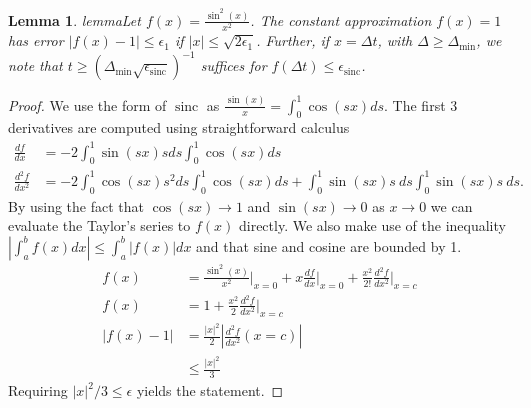 \documentclass{article}
\newtheorem{lemma}[theorem]{Lemma}
\newcommand{\abs}[1]{\left| #1 \right|}
\DeclareMathOperator{\sinc}{sinc}
\begin{document}
\begin{lemma}{lemma}\label{lem:sinc_poly_approx}
    Let $f(x) = \frac{\sin^2(x)}{x^2}$. The constant approximation $f(x) = 1$ has error $|f(x) - 1| \leq \epsilon_{1}$ if $|x| \leq \sqrt{2 \epsilon_{1}}$. Further, if $x = \Delta t$, with $\Delta \geq \Delta_{\min}$, we note that $t \geq (\Delta_{\min} \sqrt{\epsilon_{\sinc} } )^{-1}$ suffices for $f(\Delta t) \leq \epsilon_{\sinc}$.
\end{lemma}
\begin{proof}
    We use the form of $\sinc$ as $\frac{\sin(x)}{x} = \int_0^1 \cos(sx) ds$. The first 3 derivatives are computed using straightforward calculus
    \begin{align}
        \frac{df}{dx} &= -2 \int_0^1 \sin(sx) s ds \int_0^1 \cos(sx) ds \\
        \frac{d^2f}{dx^2} &= -2 \int_0^1 \cos(sx)s^2 ds \int_0^1 \cos(sx) ds + \int_0^1 \sin(sx) s ~ds \int_0^1 \sin(sx) s ~ds.
    \end{align}
    By using the fact that $\cos(sx) \to 1$ and $\sin(sx) \to 0$ as $x \to 0$ we can evaluate the Taylor's series to $f(x)$ directly. We also make use of the inequality $\abs{\int_a^b f(x) dx} \leq \int_a^b \abs{f(x)} dx$ and that sine and cosine are bounded by 1.
    \begin{align}
        f(x) &= \frac{\sin^2(x)}{x^2} \bigg|_{x = 0} + x \frac{df}{dx}\bigg|_{x = 0} + \frac{x^2}{2!} \frac{d^2f}{dx^2}\bigg|_{x=c} \\
        f(x) &= 1 + \frac{x^2}{2} \frac{d^2f}{dx^2}\bigg|_{x=c}  \\
        \abs{f(x) - 1} &= \frac{\abs{x}^2}{2} \abs{\frac{d^2f}{dx^2}(x=c)} \\
        &\leq \frac{|x|^2}{3}
    \end{align}
    Requiring $|x|^2/3 \leq \epsilon$ yields the statement.
    

\end{proof}
\end{document}
